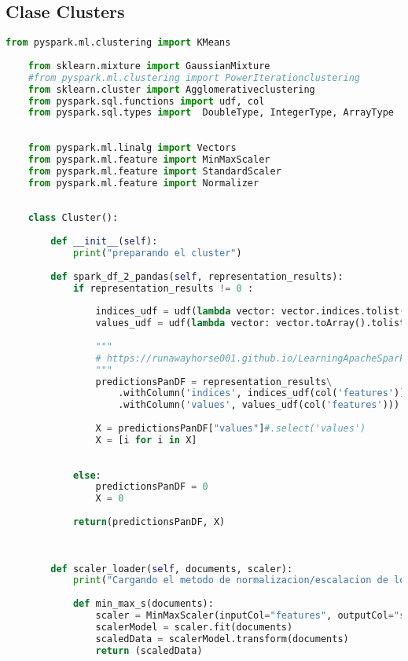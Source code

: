 \documentclass[12pt]{article}
\begin{document}
	
	\subsection{ Clase Clusters}
	\begin{lstlisting}[language=Python, caption = Clase Clusters]
	from pyspark.ml.clustering import KMeans
	
	from sklearn.mixture import GaussianMixture
	#from pyspark.ml.clustering import PowerIterationclustering
	from sklearn.cluster import Agglomerativeclustering
	from pyspark.sql.functions import udf, col
	from pyspark.sql.types import  DoubleType, IntegerType, ArrayType
	
	
	from pyspark.ml.linalg import Vectors
	from pyspark.ml.feature import MinMaxScaler
	from pyspark.ml.feature import StandardScaler
	from pyspark.ml.feature import Normalizer
	
	
	class Cluster():
	    
	    def __init__(self):
	        print("preparando el cluster")
	        
	    def spark_df_2_pandas(self, representation_results):
	        if representation_results != 0 :
	                            
	            indices_udf = udf(lambda vector: vector.indices.tolist(), ArrayType(IntegerType()))
	            values_udf = udf(lambda vector: vector.toArray().tolist(), ArrayType(DoubleType()))
	            
	            """
	            # https://runawayhorse001.github.io/LearningApacheSpark/manipulation.html
	            """
	            predictionsPanDF = representation_results\
	                .withColumn('indices', indices_udf(col('features')))\
	                .withColumn('values', values_udf(col('features'))).toPandas()
	                
	            X = predictionsPanDF["values"]#.select('values')
	            X = [i for i in X]
	            
	            
	        else:
	            predictionsPanDF = 0
	            X = 0
	            
	        return(predictionsPanDF, X)
	    
	    
	
	    def scaler_loader(self, documents, scaler):
	        print("Cargando el metodo de normalizacion/escalacion de los datos")
	        
	        def min_max_s(documents):
	            scaler = MinMaxScaler(inputCol="features", outputCol="scaled_features")
	            scalerModel = scaler.fit(documents)
	            scaledData = scalerModel.transform(documents)
	            return (scaledData)
	        

\end{lstlisting}
\end{document}
